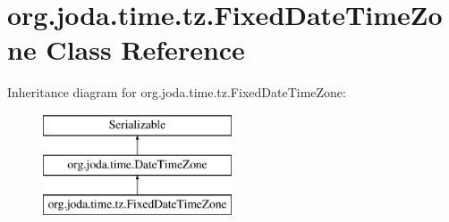 \hypertarget{classorg_1_1joda_1_1time_1_1tz_1_1_fixed_date_time_zone}{\section{org.\-joda.\-time.\-tz.\-Fixed\-Date\-Time\-Zone Class Reference}
\label{classorg_1_1joda_1_1time_1_1tz_1_1_fixed_date_time_zone}
}
Inheritance diagram for org.\-joda.\-time.\-tz.\-Fixed\-Date\-Time\-Zone\-:\begin{figure}[H]
\begin{center}
\leavevmode
\includegraphics[height=3.000000cm]{classorg_1_1joda_1_1time_1_1tz_1_1_fixed_date_time_zone}
\end{center}
\end{figure}
